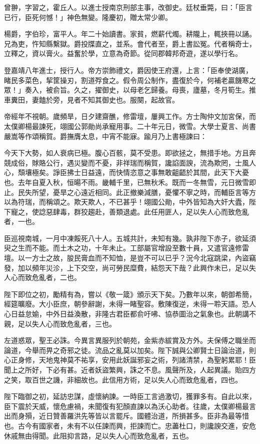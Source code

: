\begin{pinyinscope}
{{曾翀，字習之，霍丘人。以進士授南京刑部主事，改御史。廷杖垂斃，曰：「臣言已行，臣死何憾！」神色無變。隆慶初，贈太常少卿。

楊爵，字伯珍，富平人。年二十始讀書。家貧，燃薪代燭。耕隴上，輒挾冊以誦。兄為吏，忤知縣繫獄。爵投牒直之，並系。會代者至，爵上書訟冤。代者稱奇士，立釋之，資以膏火。益奮於學，立意為奇節。從同郡韓邦奇遊，遂以學行名。

登嘉靖八年進士，授行人。帝方崇飾禮文，爵因使王府還，上言：「臣奉使湖廣，睹民多菜色，挈筐操刃，割道殍食之。假令周公制作，盡復於今，何補老贏饑寒之眾！」奏入，被俞旨。久之，擢御史，以母老乞歸養。母喪，廬墓，冬月筍生。推車糞田，妻饁於旁，見者不知其御史也。服闋，起故官。

帝經年不視朝。歲頻旱，日夕建齋醮，修雷壇，屢興工作。方士陶仲文加宮保，而太僕卿楊最諫死，翊國公郭勛尚承寵用事。二十年元日，微雪。大學士夏言、尚書嚴嵩等作頌稱賀。爵撫膺太息，中宵不能寐。踰月乃上書極諫曰：

今天下大勢，如人衰病已極。腹心百骸，莫不受患。即欲拯之，無措手地。方且奔競成俗，賕賂公行，遇災變而不憂，非祥瑞而稱賀，讒諂面諛，流為欺罔，士風人心，頹壤極矣。諍臣拂士日益遠，而快情恣意之事無敢齟齬於其間，此天下大憂也。去年自夏入秋，恒暘不雨。畿輔千里，已無秋禾。既而一冬無雪，元日微雪即止。民失所望，憂旱之心遠近相同。此正撤樂減膳，憂懼不寧之時，而輔臣言等方以為符瑞，而稱頌之。欺天欺人，不已甚乎！翊國公勛，中外皆知為大奸大蠹，陛下寵之，使諗惡肆毒，群狡趨赴，善類退處。此任用匪人，足以失人心而致危亂者，一也。

臣巡視南城，一月中凍餒死八十人。五城共計，未知有幾。孰非陛下赤子，欲延須臾之生而不能。而土木之功，十年未止。工部屬官增設至數十員，又遣官遠修雷壇。以一方士之故，朘民膏血而不知恤，是豈不可以已乎？況今北寇跳梁，內盜竊發，加以頻年災沴，上下交空，尚可勞民糜費，結怨天下哉？此興作未已，足以失人心而致危亂者，二也。

陛下即位之初，勵精有為，嘗以《敬一箴》頒示天下矣。乃數年以來，朝御希簡，經筵曠廢。大小臣庶，朝參辭謝，未得一睹聖容。敷陳復逆，未得一聆天語。恐人心日益怠媮，中外日益渙散，非隆古君臣都俞吁咈、協恭圖治之氣象也。此朝講不親，足以失人心而致危亂者，三也。

左道惑眾，聖王必誅。今異言異服列於朝苑，金紫赤紱賞及方外。夫保傅之職坐而論道，今舉而畀之奇邪之徒。流品之亂莫以加矣。陛下誠與公卿賢士日論治道，則心正身修，天地鬼神莫不祐享，安用此妖誕邪妄之術，列諸清禁，為聖躬累耶！臣聞上之所好，下必有甚。近者妖盜繁興，誅之不息。風聲所及，人起異議。貽四方之笑，取百世之譏，非細故也。此信用方術，足以失人心而致危亂者，四也。

陛下臨御之初，延訪忠謀，虛懷納諫。一時臣工言過激切，獲罪多有。自此以來，臣下震於天威，懷危慮禍，未聞復有犯顏直諫以為沃心助者。往歲，太僕卿楊最言出而身殞，近日贊善羅洪先等皆以言罷斥。國體治道，所損甚多。臣非為最等惜也。古今有國家者，未有不以任諫而興，拒諫而亡。忠藎杜口，則讒諛交進，安危休戚無由得聞。此阻抑言路，足以失人心而致危亂者，五也。

}}
\end{pinyinscope}
